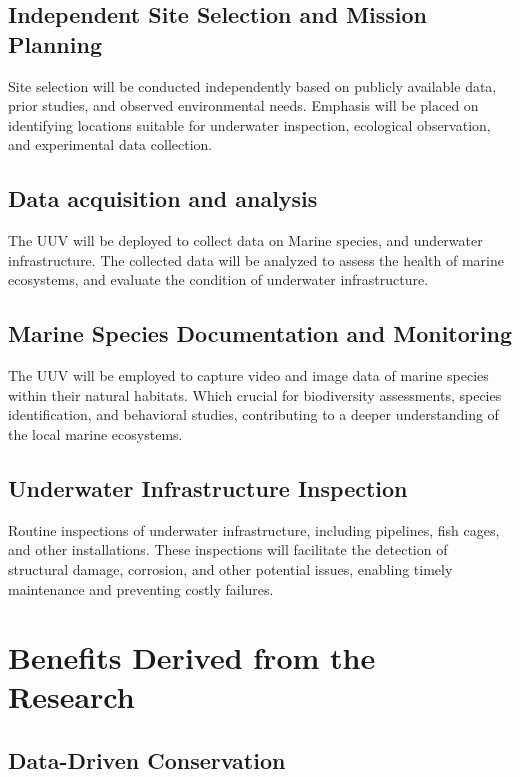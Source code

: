 \subsection{Independent Site Selection and Mission Planning}

Site selection will be conducted independently based on publicly 
available data, prior studies, and observed environmental needs. Emphasis 
will be placed on identifying locations suitable for underwater 
inspection, ecological observation, and experimental data collection. 

\subsection{Data acquisition and analysis}

The UUV will be deployed to collect data on Marine species, and underwater 
infrastructure. The collected data will be analyzed to assess the health 
of marine ecosystems, and evaluate the condition of underwater infrastructure.

\subsection{Marine Species Documentation and Monitoring}

The UUV will be employed to capture video and image data of marine 
species within their natural habitats. Which crucial for biodiversity 
assessments, species identification, and behavioral studies, contributing 
to a deeper understanding of the local marine ecosystems. 

\subsection{Underwater Infrastructure Inspection}

Routine inspections of underwater infrastructure, including pipelines, 
fish cages, and other installations. These inspections will facilitate 
the detection of structural damage, corrosion, and other potential issues, 
enabling timely maintenance and preventing costly failures.

\section{Benefits Derived from the Research}

\subsection{Data-Driven Conservation}

